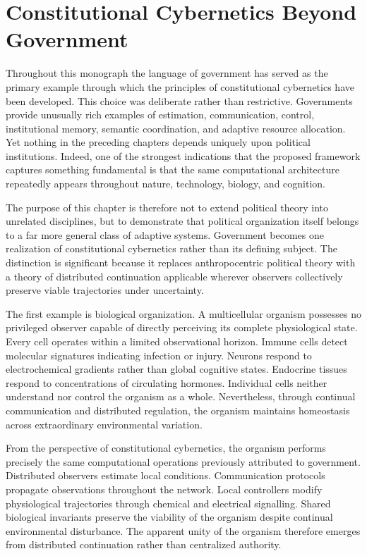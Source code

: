 \documentclass[12pt,a4paper]{article}
\begin{document}
\section{Constitutional Cybernetics Beyond Government}

Throughout this monograph the language of government has served as the primary example through which the principles of constitutional cybernetics have been developed. This choice was deliberate rather than restrictive. Governments provide unusually rich examples of estimation, communication, control, institutional memory, semantic coordination, and adaptive resource allocation. Yet nothing in the preceding chapters depends uniquely upon political institutions. Indeed, one of the strongest indications that the proposed framework captures something fundamental is that the same computational architecture repeatedly appears throughout nature, technology, biology, and cognition.

The purpose of this chapter is therefore not to extend political theory into unrelated disciplines, but to demonstrate that political organization itself belongs to a far more general class of adaptive systems. Government becomes one realization of constitutional cybernetics rather than its defining subject. The distinction is significant because it replaces anthropocentric political theory with a theory of distributed continuation applicable wherever observers collectively preserve viable trajectories under uncertainty.

The first example is biological organization. A multicellular organism possesses no privileged observer capable of directly perceiving its complete physiological state. Every cell operates within a limited observational horizon. Immune cells detect molecular signatures indicating infection or injury. Neurons respond to electrochemical gradients rather than global cognitive states. Endocrine tissues respond to concentrations of circulating hormones. Individual cells neither understand nor control the organism as a whole. Nevertheless, through continual communication and distributed regulation, the organism maintains homeostasis across extraordinary environmental variation.

From the perspective of constitutional cybernetics, the organism performs precisely the same computational operations previously attributed to government. Distributed observers estimate local conditions. Communication protocols propagate observations throughout the network. Local controllers modify physiological trajectories through chemical and electrical signalling. Shared biological invariants preserve the viability of the organism despite continual environmental disturbance. The apparent unity of the organism therefore emerges from distributed continuation rather than centralized authority.
\end{document}
